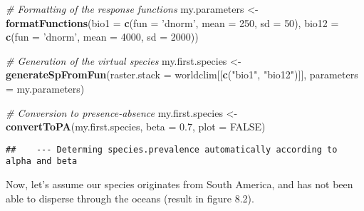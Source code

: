 \documentclass[]{article}
\newenvironment{Shaded}{\begin{snugshade}}{\end{snugshade}}
\newcommand{\KeywordTok}[1]{\textcolor[rgb]{0.13,0.29,0.53}{\textbf{#1}}}
\newcommand{\DataTypeTok}[1]{\textcolor[rgb]{0.13,0.29,0.53}{#1}}
\newcommand{\DecValTok}[1]{\textcolor[rgb]{0.00,0.00,0.81}{#1}}
\newcommand{\FloatTok}[1]{\textcolor[rgb]{0.00,0.00,0.81}{#1}}
\newcommand{\StringTok}[1]{\textcolor[rgb]{0.31,0.60,0.02}{#1}}
\newcommand{\CommentTok}[1]{\textcolor[rgb]{0.56,0.35,0.01}{\textit{#1}}}
\newcommand{\OtherTok}[1]{\textcolor[rgb]{0.56,0.35,0.01}{#1}}
\newcommand{\OperatorTok}[1]{\textcolor[rgb]{0.81,0.36,0.00}{\textbf{#1}}}
\newcommand{\NormalTok}[1]{#1}
\begin{document}
\begin{Shaded}
\begin{Highlighting}[]
\CommentTok{# Formatting of the response functions}
\NormalTok{my.parameters <-}\StringTok{ }\KeywordTok{formatFunctions}\NormalTok{(}\DataTypeTok{bio1 =} \KeywordTok{c}\NormalTok{(}\DataTypeTok{fun =} \StringTok{'dnorm'}\NormalTok{, }\DataTypeTok{mean =} \DecValTok{250}\NormalTok{, }\DataTypeTok{sd =} \DecValTok{50}\NormalTok{),}
                                 \DataTypeTok{bio12 =} \KeywordTok{c}\NormalTok{(}\DataTypeTok{fun =} \StringTok{'dnorm'}\NormalTok{, }\DataTypeTok{mean =} \DecValTok{4000}\NormalTok{, }\DataTypeTok{sd =} \DecValTok{2000}\NormalTok{))}

\CommentTok{# Generation of the virtual species}
\NormalTok{my.first.species <-}\StringTok{ }\KeywordTok{generateSpFromFun}\NormalTok{(}\DataTypeTok{raster.stack =}\NormalTok{ worldclim[[}\KeywordTok{c}\NormalTok{(}\StringTok{"bio1"}\NormalTok{, }\StringTok{"bio12"}\NormalTok{)]],}
                                      \DataTypeTok{parameters =}\NormalTok{ my.parameters)}

\CommentTok{# Conversion to presence-absence}
\NormalTok{my.first.species <-}\StringTok{ }\KeywordTok{convertToPA}\NormalTok{(my.first.species,}
                                \DataTypeTok{beta =} \FloatTok{0.7}\NormalTok{, }\DataTypeTok{plot =} \OtherTok{FALSE}\NormalTok{)}
\end{Highlighting}
\end{Shaded}

\begin{verbatim}
##    --- Determing species.prevalence automatically according to alpha and beta
\end{verbatim}

Now, let's assume our species originates from South America, and has not
been able to disperse through the oceans (result in figure 8.2).

\begin{Shaded}
\end{Shaded}
\end{document}
